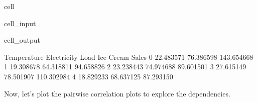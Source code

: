 \documentclass[letterpaper,10pt,english]{jupyterBook}
\begin{document}
\begin{sphinxuseclass}{cell}
\begin{sphinxVerbatimInput}
\begin{sphinxuseclass}{cell_input}
\begin{sphinxVerbatim}[commandchars=\\\{\}]
\end{sphinxVerbatim}

\end{sphinxuseclass}\end{sphinxVerbatimInput}
\begin{sphinxVerbatimOutput}

\begin{sphinxuseclass}{cell_output}
\begin{sphinxVerbatim}[commandchars=\\\{\}]
   Temperature  Electricity Load  Ice Cream Sales
0    22.483571         76.386598       143.654668
1    19.308678         64.318811        94.658826
2    23.238443         74.974688        89.601501
3    27.615149         78.501907       110.302984
4    18.829233         68.637125        87.293150
\end{sphinxVerbatim}

\end{sphinxuseclass}\end{sphinxVerbatimOutput}

\end{sphinxuseclass}
\sphinxAtStartPar
Now, let’s plot the pairwise correlation plots to explore the dependencies.
\end{document}
